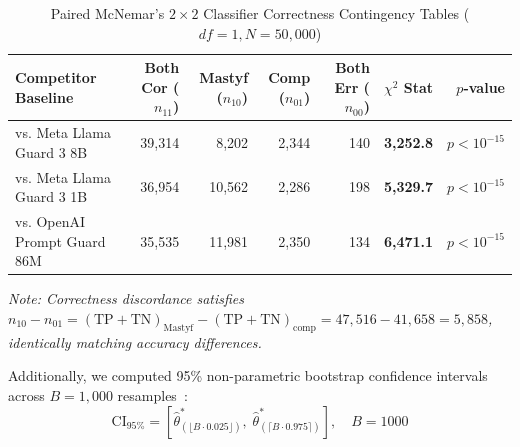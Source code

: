 \documentclass[10pt,journal,compsoc]{IEEEtran}
\begin{document}
\begin{table}[t]
\centering
\caption{Paired McNemar's $2 \times 2$ Classifier Correctness Contingency Tables ($df = 1, N = 50,000$)}
\begin{tabular}{lrrrrrr}
\toprule
\textbf{Competitor Baseline} & \textbf{Both Cor ($n_{11}$)} & \textbf{Mastyf ($n_{10}$)} & \textbf{Comp ($n_{01}$)} & \textbf{Both Err ($n_{00}$)} & \textbf{$\chi^2$ Stat} & \textbf{$p$-value} \\
\midrule
vs. Meta Llama Guard 3 8B & 39,314 & 8,202 & 2,344 & 140 & \textbf{3,252.8} & $p < 10^{-15}$ \\
vs. Meta Llama Guard 3 1B & 36,954 & 10,562 & 2,286 & 198 & \textbf{5,329.7} & $p < 10^{-15}$ \\
vs. OpenAI Prompt Guard 86M & 35,535 & 11,981 & 2,350 & 134 & \textbf{6,471.1} & $p < 10^{-15}$ \\
\bottomrule
\end{tabular}
\end{table}

\noindent\textit{Note: Correctness discordance satisfies $n_{10} - n_{01} = (\text{TP}+\text{TN})_{\text{Mastyf}} - (\text{TP}+\text{TN})_{\text{comp}} = 47,516 - 41,658 = 5,858$, identically matching accuracy differences.}

Additionally, we computed 95\% non-parametric bootstrap confidence intervals across $B = 1,000$ resamples~\cite{ref_14}:
\begin{equation}
\mathrm{CI}_{95\%} = \left[ \hat{\theta}^*_{(\lfloor B \cdot 0.025 \rfloor)}, \; \hat{\theta}^*_{(\lceil B \cdot 0.975 \rceil)} \right], \quad B = 1000
\end{equation}
\end{document}
